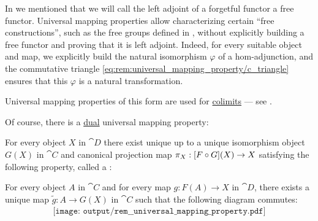 \begin{remark}
  In  we mentioned that we will call the left adjoint of a forgetful functor a free functor. Universal mapping properties allow characterizing certain \enquote{free constructions}, such as the free groups defined in , without explicitly building a free functor and proving that it is left adjoint. Indeed, for every suitable object and map, we explicitly build the natural isomorphism \( \varphi \) of a hom-adjunction, and the commutative triangle \eqref{eq:rem:universal_mapping_property/c_triangle} ensures that this \( \varphi \) is a natural transformation.

  Universal mapping properties of this form are used for \hyperref[def:category_of_cones/colimit]{colimits} --- see .

  Of course, there is a \hyperref[rem:categorical_principle_of_duality]{dual} universal mapping property:
  \begin{displayquote}
    For every object \( X \) in \( \cat{D} \) there exist unique up to a unique isomorphism object \( G(X) \) in \( \cat{C} \) and canonical projection map \( \pi_X: [F \bincirc G](X) \to X \) satisfying the following property, called a :
    \begin{displayquote}
      For every object \( A \) in \( \cat{C} \) and for every map \( g: F(A) \to X \) in \( \cat{D} \), there exists a unique map \( \widetilde{g}: A \to G(X) \) in \( \cat{C} \) such that the following diagram commutes:
      \begin{equation}\label{eq:rem:universal_mapping_property/d_triangle}
        \begin{aligned}
          \texttt{[image: output/rem\_\_universal\_mapping\_property.pdf]}
        \end{aligned}
      \end{equation}
    \end{displayquote}
  \end{displayquote}


\end{remark}
